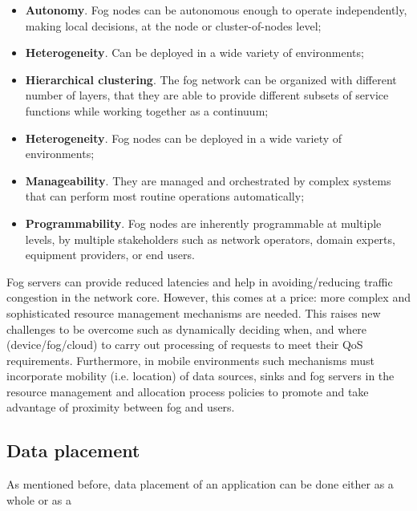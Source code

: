\begin{itemize}
	\item \textbf{Autonomy}. Fog nodes can be autonomous enough to operate independently, making local decisions, at the node or cluster-of-nodes level;
	\item \textbf{Heterogeneity}. Can be deployed in a wide variety of environments;
	\item \textbf{Hierarchical clustering}. The fog network can be organized with different number of layers, that they are able to provide different subsets of service functions while working together as a continuum;
	\item \textbf{Heterogeneity}. Fog nodes can be deployed in a wide variety of environments;
	\item \textbf{Manageability}. They are managed and orchestrated by complex systems that can perform most routine operations automatically;
	\item \textbf{Programmability}. Fog nodes are inherently programmable at multiple levels, by multiple stakeholders such as network operators, domain experts, equipment providers, or end users.
\end{itemize}
\noindent\tab Fog servers can provide reduced latencies and help in avoiding/reducing traffic congestion in the network core. However, this comes at a price: more complex and sophisticated resource management mechanisms are needed. This raises new challenges to be overcome such as dynamically deciding when, and where (device/fog/cloud) to carry out processing of requests to meet their QoS requirements. Furthermore, in mobile environments such mechanisms must incorporate mobility (i.e. location) of data sources, sinks and fog servers in the resource management and allocation process policies to promote and take advantage of proximity between fog and users.


\subsection{Data placement}\label{sec:Dataplacement}
As mentioned before, data placement of an application can be done either as a whole or as a 

